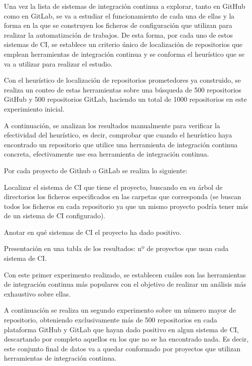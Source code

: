 Una vez  la lista de sistemas de integración continua a explorar, tanto en GitHub como en GitLab, se va a estudiar el funcionamiento de cada una de ellas y la forma en la que se construyen los ficheros de configuración que utilizan para realizar la automatización de trabajos. De esta forma, por cada uno de estos sistemas de CI, se establece un criterio único de localización de repositorios que emplean herramientas de integración continua y se conforma el heurístico que se va a utilizar para realizar el estudio.

Con el heurístico de localización de repositorios prometedores ya construido, se realiza un conteo de estas herramientas sobre una búsqueda de 500 repositorios GitHub y 500 repositorios GitLab, haciendo un total de 1000 repositorios en este experimiento inicial.

A continuación, se analizan los resultados manualmente para verificar la efectividad del heurístico, es decir, comprobar que cuando el heurístico haya encontrado un repositorio que utilice una herramienta de integración continua concreta, efectivamente use esa herramienta de integración continua.

Por cada proyecto de Github o GitLab se realiza lo siguiente:
\begin{compactitem}
    \item Localizar el sistema de CI que tiene el proyecto, buscando en su árbol de directorios los ficheros especificados en las carpetas que corresponda (se buscan todos los ficheros en cada repositorio ya que un mismo proyecto podría tener más de un sistema de CI configurado).
    \item Anotar en qué sistemas de CI el proyecto ha dado positivo.
    \item Presentación en una tabla de los resultados: nº de proyectos que usan cada sistema de CI.
\end{compactitem}
	
Con este primer experimento realizado, se establecen cuáles son las herramientas de integración continua más populares con el objetivo de realizar un análisis más exhaustivo sobre ellas.

A continuación se realiza un segundo experimento sobre un número mayor de repositorio, obteniendo exclusivamente más de 500 repositorios en cada plataforma GitHub y  GitLab que hayan dado positivo en algun sistema de CI, descartando por completo aquellos en los que no se ha encontrado nada. Es decir, este conjunto final de datos va a quedar conformado por proyectos que utilizan herramientas de integración continua.

